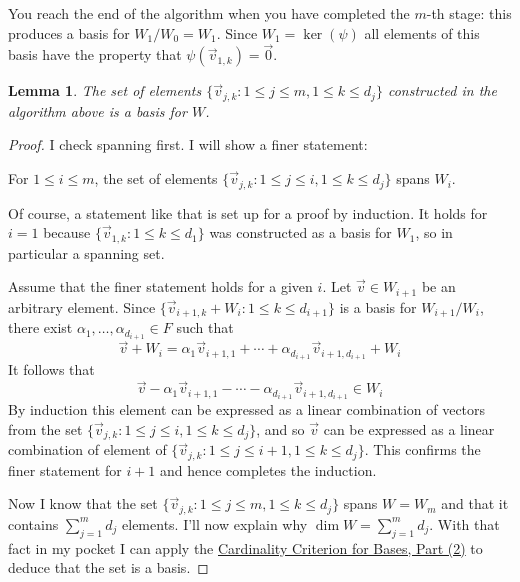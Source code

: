 \documentclass[11pt]{amsbook}
\newtheorem{lemma}[theorem]{Lemma}
\theoremstyle{definition}
\begin{document}
You reach the end of the algorithm when you have completed the $m$-th stage: this produces a basis for $W_1/W_0 = W_1$. Since $W_1 = \ker (\psi)$ all elements of this basis have the property that $\psi (\vec{v}_{1, k}) = \vec{0}$.

\begin{lemma} The set of elements $\{ \vec{v}_{j,k} : 1\leqslant j \leqslant m, 1\leqslant k\leqslant d_j \}$ constructed in the algorithm above is a basis for $W$.
\end{lemma}
\begin{proof}
I check spanning first. I will show a finer statement:

\begin{center} For $1\leqslant i \leqslant m$, the set of elements $\{ \vec{v}_{j,k} : 1\leqslant j \leqslant i, 1\leqslant k \leqslant d_j \}$ spans $W_i$. \end{center}

Of course, a statement like that is set up for a proof by induction. It holds for $i=1$ because $\{ \vec{v}_{1,k} : 1\leqslant k \leqslant d_1\}$ was constructed as a basis for $W_1$, so in particular a spanning set.

Assume that the finer statement holds for a given $i$. Let $\vec{v} \in W_{i+1}$ be an arbitrary element.  Since $\{ \vec{v}_{i+1, k} + W_{i} : 1\leqslant k \leqslant d_{i+1}\}$ is a basis for $W_{i+1}/W_i$, there exist $\alpha_1 , \ldots , \alpha_{d_{i+1}}\in F$ such that $$\vec{v} + W_{i} = \alpha_1\vec{v}_{i+1,1}  + \cdots + \alpha_{d_{i+1}} \vec{v}_{i+1, d_{i+1}} + W_{i}$$ It follows that $$\vec{v} - \alpha_1\vec{v}_{i+1,1}  - \cdots - \alpha_{d_{i+1}} \vec{v}_{i+1, d_{i+1}} \in W_{i}$$ By induction this element can be expressed as a linear combination of vectors from the set $\{ \vec{v}_{j,k} : 1\leqslant j \leqslant i, 1\leqslant k \leqslant d_j \}$, and so $\vec{v}$ can be expressed as a linear combination of element of $\{ \vec{v}_{j,k} : 1\leqslant j \leqslant i+1, 1\leqslant k \leqslant d_j \}$. This confirms the finer statement for $i+1$ and hence completes the induction.

Now I know that the set $\{ \vec{v}_{j,k} : 1\leqslant j \leqslant m, 1\leqslant k\leqslant d_j \}$ spans $W = W_m$ and that it contains $\sum_{j=1}^m d_j$ elements. I'll now explain why $\dim W = \sum_{j=1}^m d_j$. With that fact in my pocket I can apply the \hyperref[cardbasis]{Cardinality Criterion for Bases, Part (2)} to deduce that the set is a basis.


\end{proof}
\end{document}
